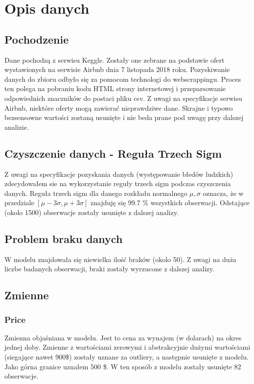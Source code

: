 \section{Opis danych}\label{sec:opis-danych}

\subsection{Pochodzenie}\label{subsec:pochodzenie}
Dane pochodzą z serwisu Keggle\cite{berlin-airbnb-data}.
Zostały one zebrane na podstawie ofert wystawionych na serwisie Airbnb dnia 7 listopada 2018 roku.
Pozyskiwanie danych do zbioru odbyło się za pomocom technologi do webscrappingu.
Proces ten polega na pobraniu kodu HTML strony internetowej i przeparsowanie odpowiednich znaczników do postaci pliku csv.
Z uwagi na specyfikacje serwisu Airbnb, niektóre oferty mogą zawierać nieprawdziwe dane.
Skrajne i typowo bezsensowne wartości zostaną usunięte i nie beda prane pod uwagę przy dalszej analizie.

\subsection{Czyszczenie danych - Reguła Trzech Sigm}\label{subsec:czyszczenie-danych-reguła-trzech-sigm}

Z uwagi na specyfikacje pozyskania danych (występowanie błedów ludzkich) zdecydowałem sie na wykorzystanie reguły trzech sigm podczas czyszczenia danych.
Reguła trzech sigm dla danego rozkładu normalnego \(\mu , \sigma\) oznacza, że w przedziale \([\mu - 3\sigma ,\mu + 3\sigma ] \) znajduję się 99.7 \% wszystkich obserwacji.
Odstające (okolo 1500) obserwacje zostały usunięte z dalszej analizy.

\subsection{Problem braku danych}\label{subsec:problem-braku-danych}
W modelu znajdowała się niewielka ilość braków (okolo 50). Z uwagi na duża liczbe badanych obserwacji, braki zostały wyrzucone z dalszej analizy.

\subsection{Zmienne}\label{subsec:zmienne}


\subsubsection{Price}\label{subsubsec:price}
Zmienna objaśniana w modelu.
Jest to cena za wynajem (w dolarach) na okres jednej doby.
Zmienne z wartościami zerowymi i abstrakcyjnie dużymi wartościami (siegające nawet 900\$) zostały uznane za outliery, a następnie usunięte z modelu.
Jako górna granice uznałem 500 \$.
W ten sposób z modelu zostały usunięte 82 obserwacje.


